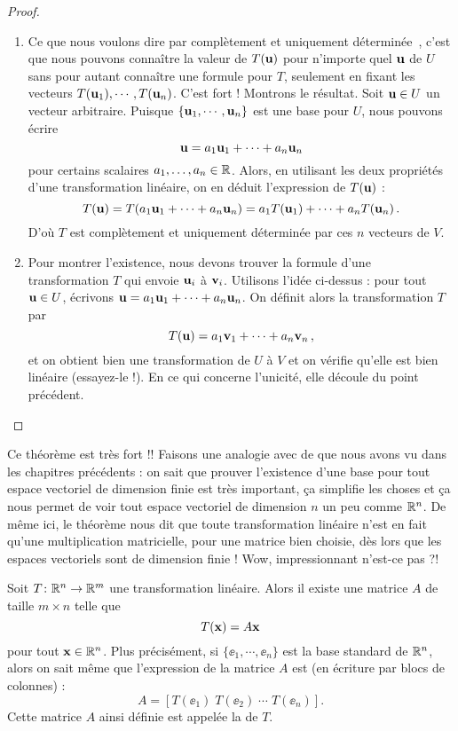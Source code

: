 \begin{proof}
\begin{enumerate}
\item Ce que nous voulons dire par \og complètement et uniquement déterminée\ \fg, c'est que nous pouvons
connaître la valeur de $T(\mathbf{u})$ pour n'importe quel $\mathbf{u}$ de $U$ sans pour autant connaître une formule pour $T$, seulement en fixant les vecteurs $T(\mathbf{u}_1),\cdots,T(\mathbf{u}_n)$. C'est fort ! Montrons le résultat. Soit $\mathbf{u} \in U$ un vecteur arbitraire.  Puisque
$\{ \mathbf{u}_1, \cdots, \mathbf{u}_n\}$ est une base pour $U$, nous pouvons
écrire
$$\mathbf{u} = a_1\mathbf{u}_1+\cdots+a_n\mathbf{u}_n$$
pour certains scalaires $a_1,\dots,a_n\in\mathbb{R}$.
Alors, en utilisant les deux propriétés d'une transformation linéaire, on en déduit l'expression de $T(\mathbf{u})$ :
$$
T(\mathbf{u}) = T(a_1\mathbf{u}_1+\cdots+a_n\mathbf{u}_n) = a_1T(\mathbf{u}_1) + \cdots + a_nT(\mathbf{u}_n)\,.
$$
D'où $T$ est complètement et uniquement déterminée par ces $n$ vecteurs de $V$.
\item Pour montrer l'existence, nous devons trouver la formule d'une transformation $T$ qui envoie $\mathbf{u}_i$ à $\mathbf{v}_i$.
Utilisons l'idée ci-dessus : pour tout $\mathbf{u} \in U$, \'ecrivons $\mathbf{u} = a_1\mathbf{u}_1+\cdots+a_n\mathbf{u}_n$.  On d\'efinit alors la transformation $T$ par
$$
T(\mathbf{u}) = a_1\mathbf{v}_1 + \cdots + a_n\mathbf{v}_n\,,
$$
et on obtient bien une transformation de $U$ à $V$ et on vérifie qu'elle est bien linéaire (essayez-le !). En ce qui concerne l'unicité, elle découle du point précédent.
\end{enumerate}
\end{proof}

Ce théorème est très fort !\!!  Faisons une analogie avec de que nous avons vu dans les chapitres précédents : on sait que prouver
l'existence d'une base pour tout espace vectoriel de dimension finie est très important, ça simplifie les choses
et ça nous permet de voir tout espace vectoriel de dimension $n$ un peu comme $\mathbb{R}^n$. De même ici, le théorème nous dit que toute
transformation linéaire n'est en fait qu'une multiplication matricielle, pour une matrice bien choisie, dès lors que les espaces vectoriels sont de dimension finie ! Wow, impressionnant n'est-ce pas ?\!!

\begin{theorem}\label{thm:standt_mat}
Soit $T \colon \mathbb{R}^n \to \mathbb{R}^m$ une transformation linéaire.  Alors
il existe une matrice $A$ de taille $m\times n$ telle que
$$
T(\mathbf{x}) = A\mathbf{x}
$$
pour tout $\mathbf{x} \in \mathbb{R}^n$.  Plus précisément, si $\{\ee_1, \cdots, \ee_n\}$
est la base standard de $\mathbb{R}^n$, alors on sait même que l'expression de la matrice $A$ est
(en écriture par blocs de colonnes) :
$$
A = \left[ T(\ee_1) \;  T(\ee_2)\; \cdots \;   T(\ee_n)\right].
$$
Cette matrice $A$ ainsi définie est appelée la  de $T$.
 \end{theorem}

